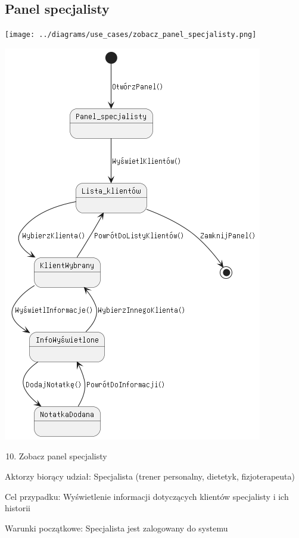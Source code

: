 \subsection{Panel specjalisty}

{\texttt{[image: ../diagrams/use\_cases/zobacz\_panel\_specjalisty.png]}}

{\includegraphics{../diagrams/state/panel_specjalisty.png}}

\begin{enumerate}
\setcounter{enumi}{9}
\tightlist
\item
  {Zobacz panel specjalisty}
\end{enumerate}

{Aktorzy biorący udział: Specjalista (trener personalny, dietetyk,
fizjoterapeuta)}

{Cel przypadku: Wyświetlenie informacji dotyczących klientów specjalisty
i ich historii}

{Warunki początkowe: Specjalista jest zalogowany do systemu}

